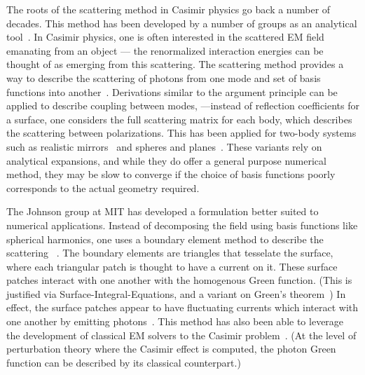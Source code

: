 The roots of the scattering method in Casimir physics go back a number of decades.  
This method has been developed by a number of groups as an analytical tool~\cite{Lambrecht2006,
MaiaNeto2008,Canaguier-Durand2012,Rahi2009}.  In Casimir physics, one is often interested in the scattered 
EM field emanating from an object --- the renormalized interaction energies can be thought of as 
emerging from this scattering.  The scattering method provides a way to describe the scattering of photons
from one mode and set of basis functions into another~\cite{Rahi2009}.
Derivations similar to the argument principle can be applied to describe coupling between modes,
---instead of reflection
coefficients for a surface, one considers the full scattering matrix for each body, which describes the scattering
between polarizations.
This has been applied for two-body systems such as realistic mirrors~\cite{Lambrecht2006}
and spheres and planes~\cite{Canaguier-Durand2012}.   
 These variants rely on analytical expansions, and while they do offer a general purpose numerical
method, they may be slow to converge if the choice of basis functions poorly corresponds to the actual
geometry required.  

The Johnson group at MIT has developed a formulation better suited to numerical applications.
Instead of decomposing the field using basis functions like spherical harmonics,
one uses a boundary element method to describe the scattering~
\cite{Rodriguez2007,Rodriguez2007a, Rodriguez2009,Reid2009,Reid2011, Reid2013}.  
The boundary elements are triangles that tesselate the surface, where each triangular patch is 
thought to have a current on it.  
These surface patches interact with one another with the homogenous Green function.  
(This is justified via Surface-Integral-Equations\cite{Stratton1941}, and a variant on Green's theorem~\cite{Emig2004})
In effect, the surface patches appear to have fluctuating currents which interact with one another by emitting 
photons~\cite{Reid2013}.  
This method has also been able to leverage the development of classical EM solvers to the Casimir problem~\cite{Johnson2011}.
(At the level of perturbation theory where the Casimir effect is computed, the photon Green function 
can be described by its classical counterpart.)



